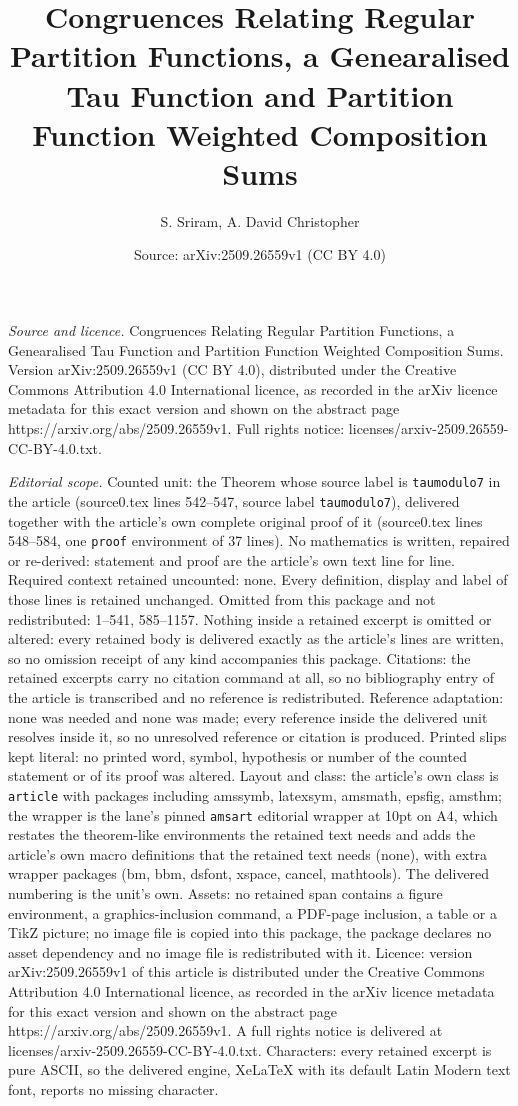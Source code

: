 \documentclass[10pt,a4paper]{amsart}
\title[Congruences Relating Regular Partition Functions, a Genearal]{Congruences Relating Regular Partition Functions, a Genearalised Tau Function and Partition Function Weighted Composition Sums}
\author{S. Sriram, A. David Christopher}
\date{Source: arXiv:2509.26559v1 (CC BY 4.0)}
\begin{document}
\maketitle

\noindent\emph{Source and licence.} Congruences Relating Regular Partition Functions, a Genearalised Tau Function and Partition Function Weighted Composition Sums. Version arXiv:2509.26559v1 (CC BY 4.0), distributed under the Creative Commons Attribution 4.0 International licence, as recorded in the arXiv licence metadata for this exact version and shown on the abstract page https://arxiv.org/abs/2509.26559v1. Full rights notice: licenses/arxiv-2509.26559-CC-BY-4.0.txt.\par\smallskip

\noindent\textit{Editorial scope.} Counted unit: the Theorem whose source label is \texttt{taumodulo7} in the article (source0.tex lines 542--547, source label \texttt{taumodulo7}), delivered together with the article's own complete original proof of it (source0.tex lines 548--584, one \texttt{proof} environment of 37 lines). No mathematics is written, repaired or re-derived: statement and proof are the article's own text line for line. Required context retained uncounted: none. Every definition, display and label of those lines is retained unchanged. Omitted from this package and not redistributed: 1--541, 585--1157. Nothing inside a retained excerpt is omitted or altered: every retained body is delivered exactly as the article's lines are written, so no omission receipt of any kind accompanies this package. Citations: the retained excerpts carry no citation command at all, so no bibliography entry of the article is transcribed and no reference is redistributed. Reference adaptation: none was needed and none was made; every reference inside the delivered unit resolves inside it, so no unresolved reference or citation is produced. Printed slips kept literal: no printed word, symbol, hypothesis or number of the counted statement or of its proof was altered. Layout and class: the article's own class is \texttt{article} with packages including amssymb, latexsym, amsmath, epsfig, amsthm; the wrapper is the lane's pinned \texttt{amsart} editorial wrapper at 10pt on A4, which restates the theorem-like environments the retained text needs and adds the article's own macro definitions that the retained text needs (none), with extra wrapper packages (bm, bbm, dsfont, xspace, cancel, mathtools). The delivered numbering is the unit's own. Assets: no retained span contains a figure environment, a graphics-inclusion command, a PDF-page inclusion, a table or a TikZ picture; no image file is copied into this package, the package declares no asset dependency and no image file is redistributed with it. Licence: version arXiv:2509.26559v1 of this article is distributed under the Creative Commons Attribution 4.0 International licence, as recorded in the arXiv licence metadata for this exact version and shown on the abstract page https://arxiv.org/abs/2509.26559v1. A full rights notice is delivered at licenses/arxiv-2509.26559-CC-BY-4.0.txt. Characters: every retained excerpt is pure ASCII, so the delivered engine, XeLaTeX with its default Latin Modern text font, reports no missing character.
\end{document}
